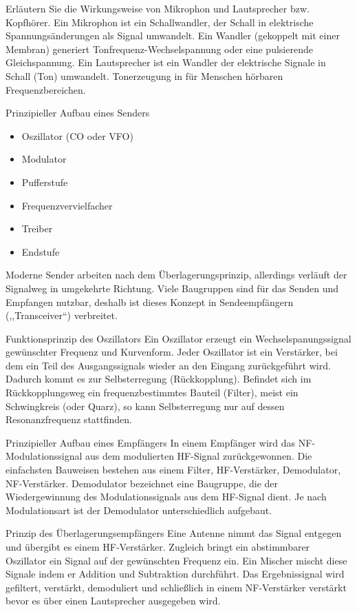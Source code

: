 \documentclass[avery5371,grid,frame,a4paper]{flashcards}
\newcommand{\card}[3]{
  \begin{flashcard}[{\chap} -- #1]{#2}#3\end{flashcard}
}
\begin{document}
\card{10}{Erläutern Sie die Wirkungsweise von Mikrophon und Lautsprecher bzw. Kopfhörer.}{
  Ein Mikrophon ist ein Schallwandler, der Schall in elektrische Spannungsänderungen als Signal umwandelt. Ein Wandler (gekoppelt mit einer Membran) generiert Tonfrequenz-Wechselspannung oder eine pulsierende Gleichspannung. Ein Lautsprecher ist ein Wandler der elektrische Signale in Schall (Ton) umwandelt. Tonerzeugung in für Menschen hörbaren Frequenzbereichen.
}
\card{11}{Prinzipieller Aufbau eines Senders}{
  \small
  \begin{itemize}\itemsep-2pt
    \item Oszillator (CO oder VFO)
    \item Modulator
    \item Pufferstufe
    \item Frequenzvervielfacher
    \item Treiber
    \item Endstufe
  \end{itemize}
  Moderne Sender arbeiten nach dem Überlagerungsprinzip, allerdings verläuft der Signalweg in umgekehrte Richtung. Viele Baugruppen sind für das Senden und Empfangen nutzbar, deshalb ist dieses Konzept in Sendeempfängern (,,Transceiver``) verbreitet.
}
\card{12}{Funktionsprinzip des Oszillators}{
  Ein Oszillator erzeugt ein Wechselspanungssignal gewünschter Frequenz und Kurvenform.
  Jeder Oszillator ist ein Verstärker, bei dem ein Teil des Ausgangssignals wieder an den Eingang zurückgeführt wird. Dadurch kommt es zur Selbsterregung (Rückkopplung). Befindet sich im Rückkopplungsweg ein frequenzbestimmtes Bauteil (Filter), meist ein Schwingkreis (oder Quarz), so kann Selbsterregung nur auf dessen Resonanzfrequenz stattfinden.
}
\card{13}{Prinzipieller Aufbau eines Empfängers}{
  In einem Empfänger wird das NF-Modulationssignal aus dem modulierten HF-Signal zurückgewonnen.
  Die einfachsten Bauweisen bestehen aus einem Filter, HF-Verstärker, Demodulator, NF-Verstärker.
  Demodulator bezeichnet eine Baugruppe, die der Wiedergewinnung des Modulationssignals aus dem HF-Signal dient. Je nach Modulationsart ist der Demodulator unterschiedlich aufgebaut.
}
\card{14}{Prinzip des Überlagerungsempfängers}{
  Eine Antenne nimmt das Signal entgegen und übergibt es einem HF-Verstärker. Zugleich bringt ein abstimmbarer Oszillator ein Signal auf der gewünschten Frequenz ein. Ein Mischer mischt diese Signale indem er Addition und Subtraktion durchführt. Das Ergebnissignal wird gefiltert, verstärkt, demoduliert und schließlich in einem NF-Verstärker verstärkt bevor es über einen Lautsprecher ausgegeben wird.
}
\end{document}
